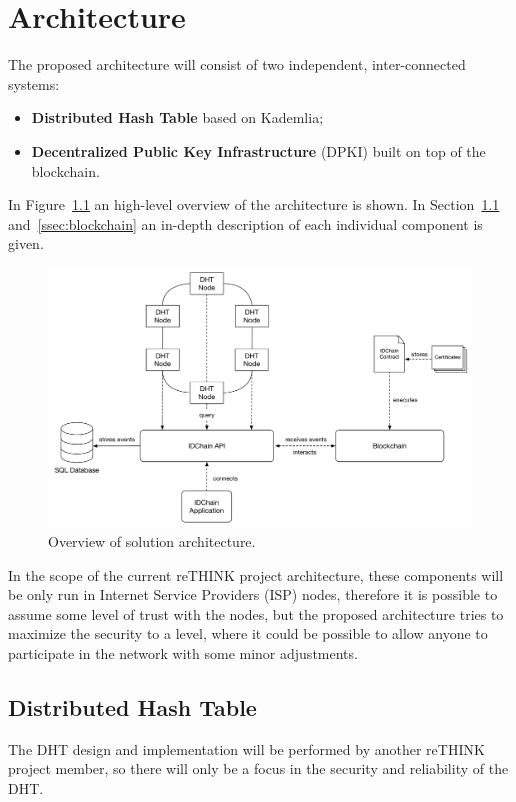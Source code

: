 \chapter{Architecture}
\label{chapter:architecture}
The proposed architecture will consist of two independent, inter-connected systems:

\begin{itemize}
	\item \textbf{Distributed Hash Table} based on Kademlia;
	\item \textbf{Decentralized Public Key Infrastructure} (DPKI) built on top of the blockchain.
\end{itemize}

In Figure~\ref{fig:architecture-overview} an high-level overview of the architecture is shown. In Section~\ref{ssec:dht} and~\ref{ssec:blockchain} an in-depth description of each individual component is given.

\begin{figure}
  \includegraphics[width=\linewidth]{Figures/architecture-overview.pdf}
    \caption{Overview of solution architecture.}
    \label{fig:architecture-overview}
\end{figure}

In the scope of the current reTHINK project architecture, these components will be only run in Internet Service Providers (ISP) nodes, therefore it is possible to assume some level of trust with the nodes, but the proposed architecture tries to maximize the security to a level, where it could be possible to allow anyone to participate in the network with some minor adjustments.

\section{Distributed Hash Table} \label{ssec:dht}
The DHT design and implementation will be performed by another reTHINK project member, so there will only be a focus in the security and reliability of the DHT.

